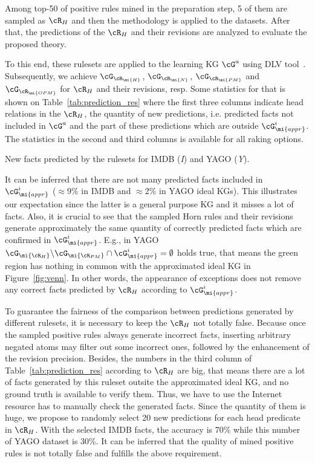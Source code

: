 Among top-50 of positive rules mined in the preparation step, 5 of them are sampled as $\cR_H$ and then the methodology is applied to the datasets. After that, the predictions of the $\cR_H$ and their revisions are analyzed to evaluate the proposed theory.

To this end, these rulesets are applied to the learning KG $\cG^a$ using DLV tool~\cite{dlv}. Subsequently, we achieve $\cG_{\cR_\mi{H}}$, $\cG_{\cR_\mi{N}}$, $\cG_{\cR_\mi{PM}}$ and $\cG_{\cR_\mi{OPM}}$ for $\cR_H$ and their revisions, resp. Some statistics for that is shown on Table~\ref{tab:prediction_res} where the first three columns indicate head relations in the $\cR_H$, the
quantity of new predictions, i.e. predicted facts not included in $\cG^a$ and the part of these predictions which are outside $\cG^i_{\mi{appr}}$. The statistics in the second and third columns is available for all raking options.

\begin{table}[ht]
\centering

\smallskip
\caption{New facts predicted by the rulesets for IMDB (\textit{I}) and YAGO (\textit{Y}).}
\label{tab:prediction_res}
\vspace*{-1.7\baselineskip}
\end{table}

It can be inferred that there are not many predicted facts included in $\cG^i_{\mi{appr}}$ ($\approx$9\% in IMDB and $\approx$2\% in YAGO ideal KGs). This illustrates our expectation since the latter is a general purpose KG and it misses a lot of facts. Also, it is crucial to see that the sampled Horn rules and their revisions generate approximately the same quantity of correctly predicted facts which are confirmed in $\cG^i_{\mi{appr}}$. E.g., in YAGO $\cG_{\mi{\cR_H}}\backslash \cG_{\mi{\cR_{PM}}} \cap \cG^i_{\mi{appr}}=\emptyset$ holds true, that means the green region has nothing in common with the approximated ideal KG in Figure~\ref{fig:venn}. In other words, the appearance of exceptions does not remove any correct facts predicted by $\cR_H$ according to $\cG^i_{\mi{appr}}$.

To guarantee the fairness of the comparison between predictions generated by different rulesets, it is necessary to keep the $\cR_H$ not totally false. Because once the sampled positive rules always generate incorrect facts, inserting arbitrary negated atoms may filter out some incorrect ones, followed by the enhancement of the revision precision. Besides, the numbers in the third column of Table~\ref{tab:prediction_res} according to $\cR_H$ are big, that means there are a lot of facts generated by this ruleset outsite the approximated ideal KG, and no ground truth is available to verify them. Thus, we have to use the Internet resource has to manually check the generated facts. Since the quantity of them is huge, we propose to randomly select 20 new predictions for each head predicate in $\cR_H$. With the selected IMDB facts, the accuracy is 70\% while this number of YAGO dataset is 30\%. It can be inferred that the quality of mined positive rules is not totally false and fulfills the above requirement.


